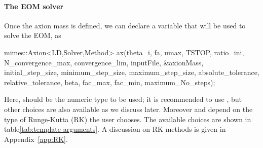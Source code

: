 \documentclass[11pt,a4paper]{article}
\begin{document}
\paragraph{The EOM solver}
Once the axion mass is defined, we can declare a variable that will be used to solve the EOM, as
%
\begin{cpp}
	mimes::Axion<LD,Solver,Method> ax(theta_i, fa, umax, TSTOP, ratio_ini, 
		N_convergence_max, convergence_lim, inputFile, &axionMass, initial_step_size,
		minimum_step_size, maximum_step_size, absolute_tolerance, relative_tolerance, 
		beta, fac_max, fac_min, maximum_No_steps);
\end{cpp}
%
Here,  should be the numeric type to be used; it is recommended to use , but other choices are also available as we discuss later. Moreover  and  depend on the type of Runge-Kutta (RK) the user chooses. The available choices are shown in table\ref{tab:template-arguments}. A discussion on RK methods is given in Appendix~\ref{app:RK}.
\end{document}
